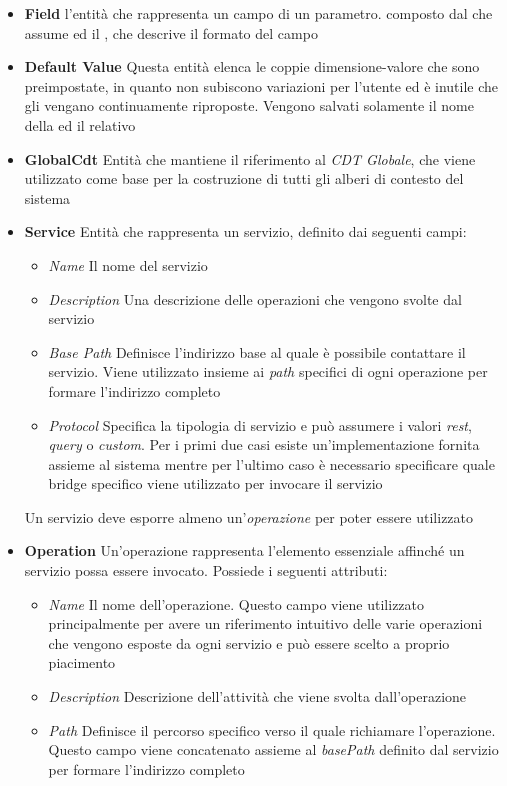 \begin{itemize}
	\item \textbf{Field} \upe l'entità che rappresenta un campo di un parametro. \upe composto dal  che assume ed il , che descrive il formato del campo
	\item \textbf{Default Value} Questa entità elenca le coppie dimensione-valore che sono preimpostate, in quanto non subiscono variazioni per l'utente ed è inutile che gli vengano continuamente riproposte. Vengono salvati solamente il nome della  ed il relativo 
	\item \textbf{GlobalCdt} Entità che mantiene il riferimento al \emph{CDT Globale}, che viene utilizzato come base per la costruzione di tutti gli alberi di contesto del sistema
	\item \textbf{Service} Entità che rappresenta un servizio, definito dai seguenti campi:
	\begin{itemize}
		\item \emph{Name} Il nome del servizio
		\item \emph{Description} Una descrizione delle operazioni che vengono svolte dal servizio
		\item \emph{Base Path} Definisce l'indirizzo base al quale è possibile contattare il servizio. Viene utilizzato insieme ai \emph{path} specifici di ogni operazione per formare l'indirizzo completo
		\item \emph{Protocol} Specifica la tipologia di servizio e può assumere i valori \emph{rest}, \emph{query} o \emph{custom}. Per i primi due casi esiste un'implementazione fornita assieme al sistema mentre per l'ultimo caso è necessario specificare quale bridge specifico viene utilizzato per invocare il servizio
	\end{itemize}
	Un servizio deve esporre almeno un'\emph{operazione} per poter essere utilizzato
	\item \textbf{Operation} Un'operazione rappresenta l'elemento essenziale affinché un servizio possa essere invocato. Possiede i seguenti attributi:
	\begin{itemize}
		\item \emph{Name} Il nome dell'operazione. Questo campo viene utilizzato principalmente per avere un riferimento intuitivo delle varie operazioni che vengono esposte da ogni servizio e può essere scelto a proprio piacimento
		\item \emph{Description} Descrizione dell'attività che viene svolta dall'operazione
		\item \emph{Path} Definisce il percorso specifico verso il quale richiamare l'operazione. Questo campo viene concatenato assieme al \emph{basePath} definito dal servizio per formare l'indirizzo completo

\end{itemize}
\end{itemize}
